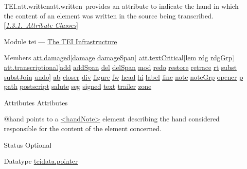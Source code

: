 \begin{reflist}
\item[]\begin{specHead}{TEI.att.written}{att.written} provides an attribute to indicate the hand in which the content of an element was written in the source being transcribed. [\textit{\hyperref[STECAT]{1.3.1.\ Attribute Classes}}]\end{specHead} 
    \item[{Module}]
  tei — \hyperref[ST]{The TEI Infrastructure}
    \item[{Members}]
  \hyperref[TEI.att.damaged]{att.damaged}[\hyperref[TEI.damage]{damage} \hyperref[TEI.damageSpan]{damageSpan}] \hyperref[TEI.att.textCritical]{att.textCritical}[\hyperref[TEI.lem]{lem} \hyperref[TEI.rdg]{rdg} \hyperref[TEI.rdgGrp]{rdgGrp}] \hyperref[TEI.att.transcriptional]{att.transcriptional}[\hyperref[TEI.add]{add} \hyperref[TEI.addSpan]{addSpan} \hyperref[TEI.del]{del} \hyperref[TEI.delSpan]{delSpan} \hyperref[TEI.mod]{mod} \hyperref[TEI.redo]{redo} \hyperref[TEI.restore]{restore} \hyperref[TEI.retrace]{retrace} \hyperref[TEI.rt]{rt} \hyperref[TEI.subst]{subst} \hyperref[TEI.substJoin]{substJoin} \hyperref[TEI.undo]{undo}] \hyperref[TEI.ab]{ab} \hyperref[TEI.closer]{closer} \hyperref[TEI.div]{div} \hyperref[TEI.figure]{figure} \hyperref[TEI.fw]{fw} \hyperref[TEI.head]{head} \hyperref[TEI.hi]{hi} \hyperref[TEI.label]{label} \hyperref[TEI.line]{line} \hyperref[TEI.note]{note} \hyperref[TEI.noteGrp]{noteGrp} \hyperref[TEI.opener]{opener} \hyperref[TEI.p]{p} \hyperref[TEI.path]{path} \hyperref[TEI.postscript]{postscript} \hyperref[TEI.salute]{salute} \hyperref[TEI.seg]{seg} \hyperref[TEI.signed]{signed} \hyperref[TEI.text]{text} \hyperref[TEI.trailer]{trailer} \hyperref[TEI.zone]{zone}
    \item[{Attributes}]
  Attributes\hfil\\[-10pt]\begin{sansreflist}
    \item[@hand]
  points to a \hyperref[TEI.handNote]{<handNote>} element describing the hand considered responsible for the content of the element concerned.
\begin{reflist}
    \item[{Status}]
  Optional
    \item[{Datatype}]
  \hyperref[TEI.teidata.pointer]{teidata.pointer}
\end{reflist}  
\end{sansreflist}  
\end{reflist}  